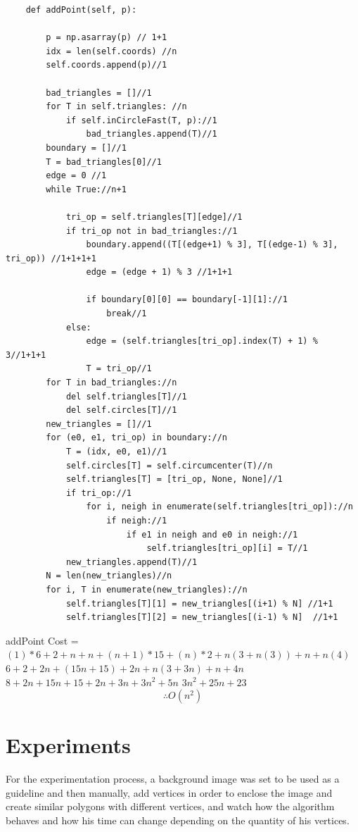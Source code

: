 \documentclass[conference]{IEEEtran}
\begin{document}
\begin{lstlisting}
    def addPoint(self, p):
    
        p = np.asarray(p) // 1+1
        idx = len(self.coords) //n
        self.coords.append(p)//1

        bad_triangles = []//1
        for T in self.triangles: //n
            if self.inCircleFast(T, p)://1
                bad_triangles.append(T)//1
        boundary = []//1
        T = bad_triangles[0]//1
        edge = 0 //1
        while True://n+1
           
            tri_op = self.triangles[T][edge]//1
            if tri_op not in bad_triangles://1
                boundary.append((T[(edge+1) % 3], T[(edge-1) % 3], tri_op)) //1+1+1+1
                edge = (edge + 1) % 3 //1+1+1

                if boundary[0][0] == boundary[-1][1]://1
                    break//1
            else:
                edge = (self.triangles[tri_op].index(T) + 1) % 3//1+1+1
                T = tri_op//1
        for T in bad_triangles://n
            del self.triangles[T]//1
            del self.circles[T]//1
        new_triangles = []//1
        for (e0, e1, tri_op) in boundary://n
            T = (idx, e0, e1)//1
            self.circles[T] = self.circumcenter(T)//n
            self.triangles[T] = [tri_op, None, None]//1
            if tri_op://1
                for i, neigh in enumerate(self.triangles[tri_op])://n
                    if neigh://1
                        if e1 in neigh and e0 in neigh://1
                            self.triangles[tri_op][i] = T//1
            new_triangles.append(T)//1
        N = len(new_triangles)//n
        for i, T in enumerate(new_triangles)://n
            self.triangles[T][1] = new_triangles[(i+1) % N] //1+1  
            self.triangles[T][2] = new_triangles[(i-1) % N]  //1+1
\end{lstlisting}
addPoint Cost = 
\newline
$(1)*6+2+n+n+(n+1)*15+(n)*2+n(3+n(3))+n+n(4)$
\newline
$6+2+2n+(15n+15)+2n+n(3+3n)+n+4n$
\newline
$8+2n+15n+15+2n+3n+3n^2+5n$
\newline
$3n^2+25n+23$
$$\therefore O(n^2)$$
\section{Experiments}
For the experimentation process, a background image was set to be used as a guideline and then manually, add vertices in order to enclose the image and create similar polygons with different vertices, and watch how the algorithm behaves and how his time can change depending on the quantity of his vertices.
\end{document}
